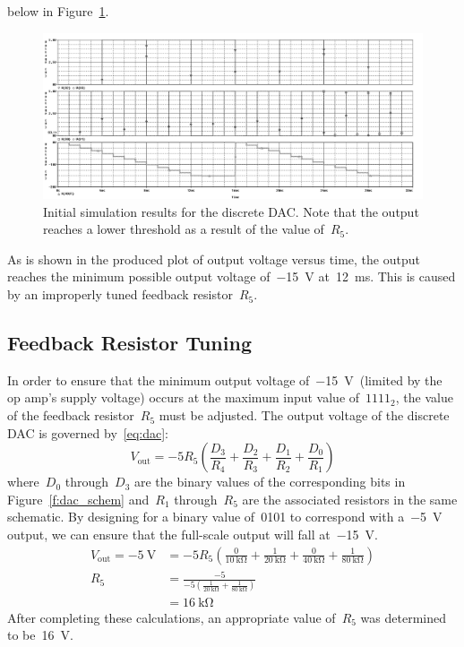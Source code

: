 below in Figure~\ref{f:dac_plot1}.
%
\begin{figure}[H]
\centering
	\includegraphics[width=.8\textwidth]{img/plot/part1_plot1b.PNG}
	\parbox{.8\textwidth}{
	\caption[Discrete DAC --- Initial Results]{Initial simulation results for
	the discrete DAC.  Note that the output reaches a lower threshold as a
	result of the value of~$R_5$.}
	\label{f:dac_plot1}}
\end{figure}
%
As is shown in the produced plot of output voltage versus time, the output
reaches the minimum possible output voltage of~\SI{-15}{\volt} at~\SI{12}{\milli\second}.  This is
caused by an improperly tuned feedback resistor~$R_5$.

\subsection{Feedback Resistor Tuning}
In order to ensure that the minimum output voltage of~\SI{-15}{\volt}~(limited
by the op amp's supply voltage) occurs at the maximum input value of~$1111_2$,
the value of the feedback resistor~$R_5$ must be adjusted.  The output voltage of the discrete DAC is governed by~\eqref{eq:dac}:
%
\begin{equation}
	V_\text{out} = - 5 R_5 \left( \frac{D_3}{R_4} + \frac{D_2}{R_3} + \frac{D_1}{R_2} + \frac{D_0}{R_1} \right)
	\label{eq:dac}
\end{equation}
%
where~$D_0$ through~$D_3$ are the binary values of the corresponding bits in
Figure~\ref{f:dac_schem} and~$R_1$ through~$R_5$ are the associated resistors
in the same schematic.  By designing for a binary value of~0101 to correspond
with a~\SI{-5}{\volt} output, we can ensure that the full-scale output will
fall at~\SI{-15}{\volt}.
%
\begin{align*}
	V_\text{out} = \SI{-5}{\volt} &= -5 R_5 \left( \frac{0}{\SI{10}{\kilo\ohm}} + \frac{1}{\SI{20}{\kilo\ohm}} + \frac{0}{\SI{40}{\kilo\ohm}} + \frac{1}{\SI{80}{\kilo\ohm}} \right) \\
	R_5 &= \frac{ -5 } { -5 \left( \frac{1}{\SI{20}{\kilo\ohm}} + \frac{1}{\SI{80}{\kilo\ohm}} \right) } \\
	    &= \SI{16}{\kilo\ohm}
\end{align*}
%
After completing these calculations, an appropriate value of~$R_5$ was
determined to be~\SI{16}{\volt}.

